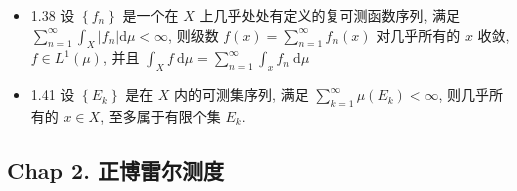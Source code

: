 \begin{itemize}
\item 1.38 设 $\left\{f_{n}\right\}$ 是一个在 $X$ 上几乎处处有定义的复可测函数序列, 满足 $\sum_{n=1}^{\infty} \int_{X}\left|f_{n}\right| \mathrm{d} \mu<\infty$, 则级数 $f(x)=\sum_{n=1}^{\infty} f_{n}(x)$ 对几乎所有的 $x$ 收敛, $f \in L^{1}(\mu)$, 并且 $\int_{X} f \mathrm{~d} \mu=\sum_{n=1}^{\infty} \int_{x} f_{n} \mathrm{~d} \mu$

\item 1.41 设 $\left\{E_{k}\right\}$ 是在 $X$ 内的可测集序列, 满足 $\sum_{k=1}^{\infty} \mu\left(E_{k}\right)<\infty$, 则几乎所有的 $x \in X$, 至多属于有限个集 $E_{k}$.
\end{itemize}

\subsection{Chap 2. 正博雷尔测度}
